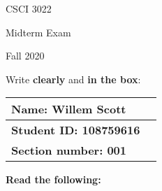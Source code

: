 \documentclass[addpoints]{exam}
\begin{document}
\begin{minipage}[ht!]{.25\textwidth}
CSCI 3022 

Midterm Exam

Fall 2020
\vfill
\end{minipage}
\begin{minipage}[ht]{.75\textwidth}
	\large
	Write \textbf{clearly} and \textbf{in the box}:
	\centering
	\begin{tabular}{|l c|} 	\hline 
	\rule{0pt}{1cm}
	\textbf{Name: Willem Scott} & \hspace{9cm} \\ \hline
	\rule{0pt}{1cm}
	\textbf{Student ID: 108759616} & \hspace{9cm} \\ \hline
	\rule{0pt}{1cm} \textbf{Section number: 001} & \hspace{9cm} \\ \hline
	\end{tabular}
\end{minipage}%

\vspace{1cm}

{\bf Read the following:}
\vspace{1pc}
\end{document}
